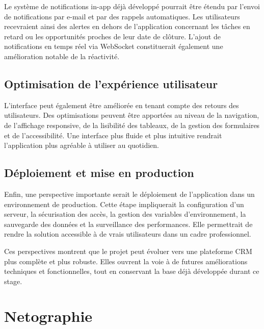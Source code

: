 \documentclass[12pt,a4paper,twoside,openany]{book}
\begin{document}
Le système de notifications in-app déjà développé pourrait être étendu par l’envoi de notifications par e-mail et par des rappels automatiques. Les utilisateurs recevraient ainsi des alertes en dehors de l’application concernant les tâches en retard ou les opportunités proches de leur date de clôture. L’ajout de notifications en temps réel via WebSocket constituerait également une amélioration notable de la réactivité.

\section*{Optimisation de l’expérience utilisateur}

L’interface peut également être améliorée en tenant compte des retours des utilisateurs. Des optimisations peuvent être apportées au niveau de la navigation, de l’affichage responsive, de la lisibilité des tableaux, de la gestion des formulaires et de l’accessibilité. Une interface plus fluide et plus intuitive rendrait l’application plus agréable à utiliser au quotidien.

\section*{Déploiement et mise en production}

Enfin, une perspective importante serait le déploiement de l’application dans un environnement de production. Cette étape impliquerait la configuration d’un serveur, la sécurisation des accès, la gestion des variables d’environnement, la sauvegarde des données et la surveillance des performances. Elle permettrait de rendre la solution accessible à de vrais utilisateurs dans un cadre professionnel.

Ces perspectives montrent que le projet peut évoluer vers une plateforme CRM plus complète et plus robuste. Elles ouvrent la voie à de futures améliorations techniques et fonctionnelles, tout en conservant la base déjà développée durant ce stage.
\chapter*{Netographie}
\end{document}
